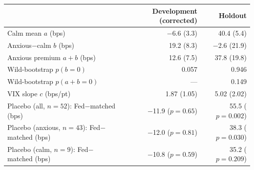 \begin{tabular}{lrr}\toprule
 & Development (corrected) & Holdout \\ \midrule
Calm mean $a$ (bps) & $-6.6$ (3.3) & 40.4 (5.4) \\
Anxious$-$calm $b$ (bps) & 19.2 (8.3) & $-$2.6 (21.9) \\
Anxious premium $a+b$ (bps) & 12.6 (7.5) & 37.8 (19.8) \\
Wild-bootstrap $p(b=0)$ & 0.057 & 0.946 \\
Wild-bootstrap $p(a+b=0)$ & --- & 0.149 \\
VIX slope $c$ (bps/pt) & 1.87 (1.05) & 5.02 (2.02) \\
\midrule
Placebo (all, $n=52$): Fed$-$matched (bps) & $-$11.9 ($p=0.65$) & 55.5 ($p=0.002$) \\
Placebo (anxious, $n=43$): Fed$-$matched (bps) & $-$12.0 ($p=0.81$) & 38.3 ($p=0.030$) \\
Placebo (calm, $n=9$): Fed$-$matched (bps) & $-$10.8 ($p=0.59$) & 35.2 ($p=0.209$) \\
\bottomrule\end{tabular}
